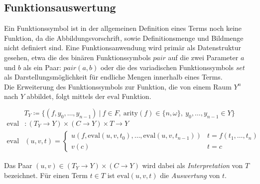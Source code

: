 \documentclass{article}
\begin{document}
\subsection{Funktionsauswertung}
Ein Funktionssymbol ist in der allgemeinen Definition eines Terms noch keine Funktion, da die Abbildungsvorschrift, sowie Definitionsmenge und Bildmenge nicht definiert sind. Eine Funktionsanwendung wird primär als Datenstruktur gesehen, etwa die des binären Funktionssymbols $pair$ auf die zwei Parameter $a$ und $b$ als ein Paar: $pair(a, b)$ oder die des variadischen Funktionssymbols $set$ als Darstellungsmöglichkeit für endliche Mengen innerhalb eines Terms.\\
Die Erweiterung des Funktionssymbols zur Funktion, die von einem Raum $Y^n$ nach $Y$ abbildet, folgt mittels der $\mathrm{eval}$ Funktion.

$$T_Y \coloneqq \{(f, y_0, \dots, y_{n-1})~|~f \in F,~\mathrm{arity}(f) \in \{n, \omega\},
~ y_0, \dots,y_{n-1} \in Y\}$$
\begin{equation*}
    \begin{split}
	\mathrm{eval} &\colon (T_Y \rightarrow Y) \times (C \rightarrow Y) \times T \rightarrow Y\\
	\mathrm{eval} &(u, v, t) = \begin{cases}
		u(f, \mathrm{eval}(u, v, t_0), \dots, \mathrm{eval}(u, v, t_{n-1})) & t = f(t_1, \dots, t_n)\\
		v(c)                                                                                      & t = c
		\end{cases}
    \end{split}
\end{equation*}

Das Paar $(u, v) \in (T_Y \rightarrow Y) \times (C \rightarrow Y)$ wird dabei als \textit{Interpretation} von $T$ bezeichnet. Für einen Term $t \in T$ ist $\mathrm{eval}(u, v, t)$ die \textit{Auswertung} von $t$.
\\~\\
\end{document}
